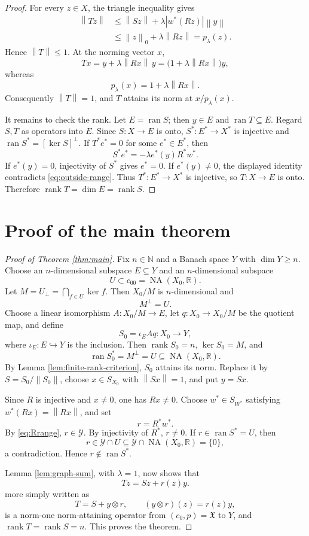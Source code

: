 \documentclass[11pt]{article}
\theoremstyle{definition}
\newcommand{\NA}{\operatorname{NA}}
\newcommand{\ran}{\operatorname{ran}}
\newcommand{\rank}{\operatorname{rank}}
\newcommand{\R}{\mathbb R}
\newcommand{\X}{\mathfrak X}
\newcommand{\Xzero}{X_0}
\newcommand{\Yop}{\mathscr Y}
\newcommand{\norm}[1]{\left\lVert #1\right\rVert}
\newcommand{\abs}[1]{\left\lvert #1\right\rvert}
\begin{document}
\begin{proof}
For every \(z\in X\), the triangle inequality gives
\begin{align*}
 \norm{Tz}
 &\leq \norm{Sz}+\lambda\abs{w^*(Rz)}\norm{y}\\
 &\leq \norm{z}_0+\lambda\norm{Rz}
  =p_\lambda(z).
\end{align*}
Hence \(\norm{T}\leq1\).  At the norming vector \(x\),
\[
     Tx=y+\lambda\norm{Rx}\,y
       =\bigl(1+\lambda\norm{Rx}\bigr)y,
\]
whereas
\[
     p_\lambda(x)=1+\lambda\norm{Rx}.
\]
Consequently \(\norm{T}=1\), and \(T\) attains its norm at
\(x/p_\lambda(x)\).

It remains to check the rank.  Let \(E=\ran S\); then \(y\in E\) and
\(\ran T\subseteq E\).  Regard \(S,T\) as operators into \(E\).  Since
\(S:X\to E\) is onto, \(S^*:E^*\to X^*\) is injective and
\(\ran S^*= [\ker S]^\perp\).  If \(T^*e^*=0\) for some \(e^*\in E^*\),
then
\[
       S^*e^*=-\lambda e^*(y)R^*w^*.
\]
If \(e^*(y)=0\), injectivity of \(S^*\) gives \(e^*=0\).  If
\(e^*(y)\neq0\), the displayed identity contradicts
\eqref{eq:outside-range}.  Thus \(T^*:E^*\to X^*\) is injective, so
\(T:X\to E\) is onto.  Therefore \(\rank T=\dim E=\rank S\).
\end{proof}

\section{Proof of the main theorem}

\begin{proof}[Proof of Theorem \ref{thm:main}]
Fix \(n\in\mathbb N\) and a Banach space \(Y\) with \(\dim Y\geq n\).
Choose an \(n\)-dimensional subspace \(E\subseteq Y\) and an
\(n\)-dimensional subspace
\[
                  U\subset c_{00}=\NA(\Xzero,\R).
\]
Let \(M=U_\perp=\bigcap_{f\in U}\ker f\).  Then \(\Xzero/M\) is
\(n\)-dimensional and
\[
                  M^\perp=U.
\]
Choose a linear isomorphism \(A:\Xzero/M\to E\), let
\(q:\Xzero\to\Xzero/M\) be the quotient map, and define
\[
                  S_0=\iota_E A q:\Xzero\longrightarrow Y,
\]
where \(\iota_E:E\hookrightarrow Y\) is the inclusion.  Then
\(\rank S_0=n\), \(\ker S_0=M\), and
\[
          \ran S_0^*=M^\perp=U\subseteq\NA(\Xzero,\R).
\]
By Lemma \ref{lem:finite-rank-criterion}, \(S_0\) attains its norm.  Replace
it by \(S=S_0/\norm{S_0}\), choose
\(x\in S_{\Xzero}\) with \(\norm{Sx}=1\), and put \(y=Sx\).

Since \(R\) is injective and \(x\neq0\), one has \(Rx\neq0\).  Choose
\(w^*\in S_{W^*}\) satisfying \(w^*(Rx)=\norm{Rx}\), and set
\[
                    r=R^*w^*.
\]
By \eqref{eq:Rrange}, \(r\in\Yop\).  By injectivity of \(R^*\),
\(r\neq0\).  If \(r\in\ran S^*=U\), then
\[
     r\in \Yop\cap U
       \subseteq \Yop\cap\NA(\Xzero,\R)
       =\{0\},
\]
a contradiction.  Hence \(r\notin\ran S^*\).

Lemma \ref{lem:graph-sum}, with \(\lambda=1\), now shows that
\[
          Tz=Sz+r(z)y.
\]
more simply written as
\[
          T=S+y\otimes r,
          \qquad (y\otimes r)(z)=r(z)y,
\]
is a norm-one norm-attaining operator from \((c_0,p)=\X\) to \(Y\), and
\(\rank T=\rank S=n\).  This proves the theorem.
\end{proof}
\end{document}
